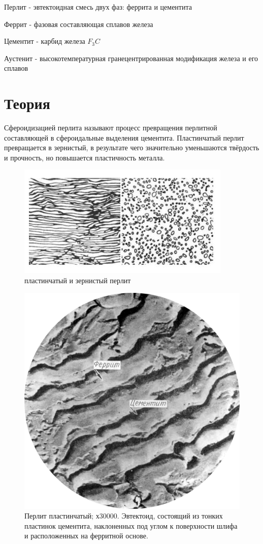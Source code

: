 \documentclass[a4paper, 14pt]{article}
\begin{document}
	Перлит - эвтектоидная смесь двух фаз: феррита и цементита
	
	Феррит - фазовая составляющая сплавов железа
	
	Цементит - карбид железа $F_3 C$
	
	Аустенит -  высокотемпературная гранецентрированная модификация железа и его сплавов
	
	 
	\section{Теория}

	Сфероидизацией перлита называют процесс превращения перлитной составляющей в сфероидальные выделения цементита.
	Пластинчатый перлит превращается в зернистый, в результате чего значительно уменьшаются твёрдость и прочность, но повышается пластичность металла.

	
	\begin{figure}[h!]
		\centering
		\includegraphics[scale=0.8]{images/пластзерн}
		\caption{пластинчатый и зернистый перлит}
	\end{figure}
	
	\begin{figure}[h!]
		\centering
		\includegraphics[scale=0.4]{images/пласт}
		\caption{ Перлит пластинчатый; х30000. Эвтектоид, состоящий из тонких пластинок цементита, наклоненных под углом к поверхности шлифа и расположенных на ферритной основе.}
	\end{figure}
	
\end{document}
